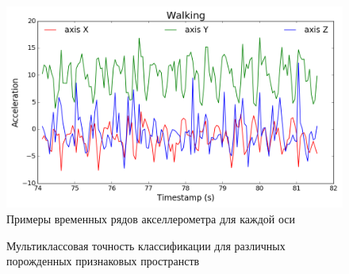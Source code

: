 \begin{figure}[!ht]
	\centering
	\includegraphics[width=1\linewidth]{figs/ch5/ts_example.png}
	\caption{Примеры временных рядов акселлерометра для каждой оси}
	\label{ch5:fig:ts_example}
\end{figure}

\begin{figure}[!ht]
	\centering
	\caption{Мультиклассовая точность классификации для различных порожденных признаковых пространств}
	\label{ch5:fig:accuracy_results}
\end{figure}

